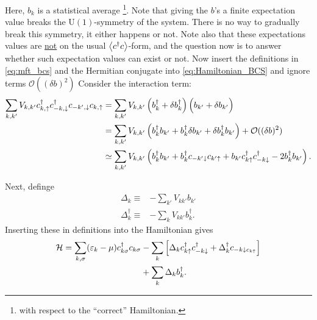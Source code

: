 Here, $b_k$ is a statistical average \footnote{with respect to the ``correct'' Hamiltonian.}. Note that giving the $b$'s a finite expectation value breaks the $\mathrm{U}(1)$-symmetry of the system. There is no way to gradually break this symmetry, it either happens or not. Note also that these expectations values are \underline{not} on the usual $\ev{c^\dagger c}$-form, and the question now is to answer whether such expectation values can exist or not.
Now insert the definitions in \cref{eq:mft_bcs} and the Hermitian conjugate into \cref{eq:Hamiltonian_BCS} and ignore terms $\mathcal{O}((\delta b)^2)$
Consider the interaction term:
\begin{align*}
\sum_{k,k'}V_{k,k'} c^{\dagger}_{k,\uparrow}c^{\dagger}_{-k, \downarrow}c_{-k',\downarrow}c_{k,\uparrow}
 &= \sum_{k,k'}V_{k,k'} \left(b_k^\dagger + \delta b_k^\dagger\right)\left(b_{k'} + \delta b_{k'}\vphantom{b_k^\dagger}\right)\\
&= \sum_{k,k'}V_{k,k'}\left(b_k^\dagger b_{k'} + b_k^\dagger\delta b_{k'} + \delta b_k^\dagger b_{k'}\right) + \mathcal{O}((\delta b)^2)\\
&\simeq \sum_{k,k'}V_{k,k'}\left(b_k^\dagger b_{k'} + b_k^\dagger c_{-k'\downarrow}c_{k'\uparrow} + b_{k'}c^{\dagger}_{k\uparrow}c^{\dagger}_{-k\downarrow} - 2b^\dagger_kb_{k'}\right).
\end{align*}

Next, definge
\begin{subequations}
	\label{eq:defs_delta}
\begin{align}
	\Delta_k\equiv&-\sum_{k'}V_{kk'}b_{k'} \label{eq:def_delta1} \\
	\Delta_k^\dagger\equiv&-\sum_{k}V_{kk'}b_k^\dagger. \label{eq:def_delta2}
\end{align}
\end{subequations}
Inserting these in definitions into the Hamiltonian gives
\begin{align}
\label{eq:BCS_MFT}
	\begin{split}
	\mathcal{H} = \sum_{k,\sigma}(\varepsilon_k - \mu)c^{\dagger}_{k\sigma}c_{k\sigma} 
	&-\sum_k\left[\Delta_k c_{k\uparrow}^\dagger c_{-k\downarrow}^\dagger + \Delta_k^\dagger c_{-k\downarrow c_{k\uparrow}}\right] \\
	&+ \sum_k \Delta_k b_k^\dagger.
	\end{split}
\end{align}

